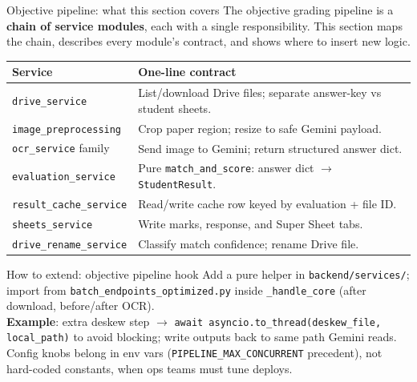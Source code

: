 \documentclass[aspectratio=169]{beamer}
\begin{document}
\begin{frame}{Objective pipeline: what this section covers}
  \small
  The objective grading pipeline is a \textbf{chain of service modules}, each with a single responsibility.
  This section maps the chain, describes every module's contract, and shows where to insert new logic.\\[0.4em]
  \begin{tabular}{@{}p{3.5cm}p{10.2cm}@{}}
    \toprule
    Service & One-line contract \\
    \midrule
    \texttt{drive\_service} & List/download Drive files; separate answer-key vs student sheets. \\
    \texttt{image\_preprocessing} & Crop paper region; resize to safe Gemini payload. \\
    \texttt{ocr\_service} family & Send image to Gemini; return structured answer dict. \\
    \texttt{evaluation\_service} & Pure \texttt{match\_and\_score}: answer dict $\rightarrow$ \texttt{StudentResult}. \\
    \texttt{result\_cache\_service} & Read/write cache row keyed by evaluation + file ID. \\
    \texttt{sheets\_service} & Write marks, response, and Super Sheet tabs. \\
    \texttt{drive\_rename\_service} & Classify match confidence; rename Drive file. \\
    \bottomrule
  \end{tabular}
\end{frame}

\begin{frame}{How to extend: objective pipeline hook}
  \small
  Add a pure helper in \texttt{backend/services/}; import from \texttt{batch\_endpoints\_optimized.py} inside \texttt{\_handle\_core} (after download, before/after OCR).\\
  \textbf{Example}: extra deskew step $\rightarrow$ \texttt{await asyncio.to\_thread(deskew\_file, local\_path)} to avoid blocking; write outputs back to same path Gemini reads.\\
  Config knobs belong in env vars (\texttt{PIPELINE\_MAX\_CONCURRENT} precedent), not hard-coded constants, when ops teams must tune deploys.
\end{frame}
\end{document}
